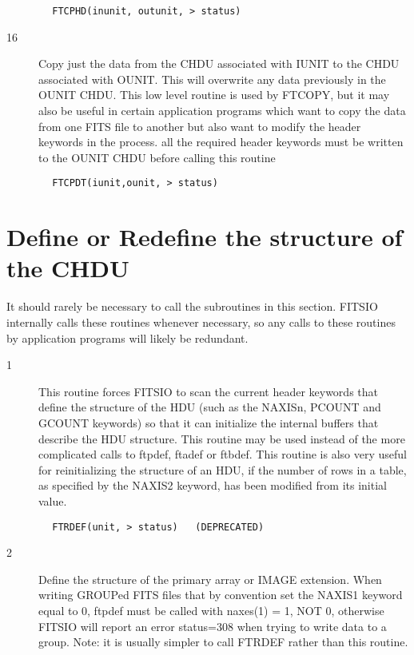 \documentclass[11pt]{book}
\begin{document}
\begin{verbatim}
        FTCPHD(inunit, outunit, > status)
\end{verbatim}

\begin{description}
\item[16] Copy just the data from the CHDU associated with IUNIT
    to the CHDU associated with OUNIT. This will overwrite
    any data previously in the OUNIT CHDU.  This low level routine is used
    by FTCOPY, but it may also be useful in certain application programs
    which want to copy the data from one FITS file to another but also
    want to modify the header keywords in the process. all the required
    header keywords must be written to the OUNIT CHDU before calling
   this routine
\end{description}

\begin{verbatim}
        FTCPDT(iunit,ounit, > status)
\end{verbatim}


\section{Define or Redefine the structure of the CHDU \label{FTRDEF}}

It should rarely be necessary to call the subroutines in this section.
FITSIO internally calls these routines whenever necessary, so any calls
to these routines by application programs will likely be redundant.


\begin{description}
\item[1 ] This routine forces FITSIO to scan the current header keywords that
    define the structure of the HDU (such as the NAXISn, PCOUNT and GCOUNT
    keywords) so that it can initialize the internal buffers that describe
    the HDU structure.  This routine may be used instead of the more
    complicated calls to ftpdef, ftadef or ftbdef.  This routine is
    also very useful for reinitializing the structure of an HDU,
    if the number of rows in a table, as specified by the NAXIS2 keyword,
   has been modified from its initial value.
\end{description}

\begin{verbatim}
        FTRDEF(unit, > status)   (DEPRECATED)
\end{verbatim}

\begin{description}
\item[2 ]Define the structure of the primary array or IMAGE extension.  When
   writing GROUPed FITS files that by convention set the NAXIS1 keyword
   equal to 0, ftpdef must be called with naxes(1) = 1, NOT 0, otherwise
   FITSIO will report an error status=308 when trying to write data
   to a group. Note: it is usually simpler to call FTRDEF rather
  than this routine.
\end{description}
\end{document}
